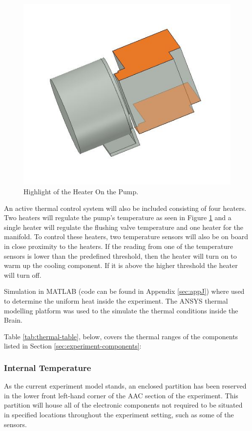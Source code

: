 \begin{figure}[H]
    \centering
    \includegraphics[width=0.5\linewidth]{4-experiment-design/img/Thermal/higlighted-heater-pump.JPG}
    \caption{Highlight of the Heater On the Pump.}
    \label{fig:highlight-heater-on-pump}
\end{figure}

An active thermal control system will also be included consisting of four heaters. Two heaters will regulate the pump's temperature as seen in Figure \ref{fig:highlight-heater-on-pump} and a single heater will regulate the flushing valve temperature and one heater for the manifold. To control these heaters, two temperature sensors will also be on board in close proximity to the heaters. If the reading from one of the temperature sensors is lower than the predefined threshold, then the heater will turn on to warm up the cooling component. If it is above the higher threshold the heater will turn off.

Simulation in MATLAB (code can be found in Appendix \ref{sec:appJ}) where used to determine the uniform heat inside the experiment. The ANSYS thermal modelling platform was used to the simulate the thermal conditions inside the Brain.

Table {\ref{tab:thermal-table}}, below, covers the thermal ranges of the components listed in Section \ref{sec:experiment-components}:



\raggedbottom

\subsubsection{Internal Temperature}
As the current experiment model stands, an enclosed partition has been reserved in the lower front left-hand corner of the AAC section of the experiment. This partition will house all of the electronic components not required to be situated in specified locations throughout the experiment setting, such as some of the sensors.

